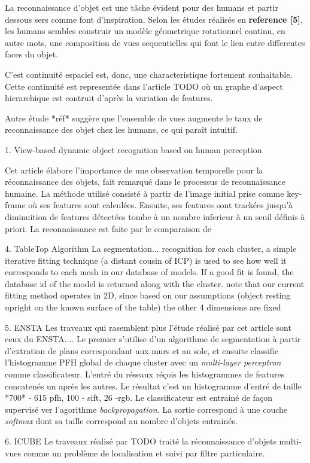 {La reconnaissance d'objet est une tâche évident pour des humans et partir dessous sers comme font d'inspiration.
Selon les études réalisés en \textbf{reference [5]}, les humans sembles construir un modèle géometrique rotationnel continu, en autre mots, une composition de vues sequentielles qui font le lien entre differentes faces du objet. 

C'est continuité espaciel est, donc, une characteristique fortement souhaitable. Cette continuité est representée dans l'article {\color{red} TODO} où un graphe d'aspect hierarchique est contruit d'après la variation de features. 

Autre étude *réf* suggère que l'ensemble de vues augmente le taux de reconnaissance des objet chez les humans, ce qui paraît intuitif.


1. View-based dynamic object recognition based on human perception 

Cet article élabore l'importance de une observation temporelle pour la réconnaissance des objets, fait remarqué dans le processus de reconnaissance humaine.
La méthode utilisé consisté à partir de l'image initial prise comme key-frame où ses features sont calculées. Ensuite, ses features sont trackées jusqu'à diminuition de features détectées tombe à un nombre inferieur à un seuil définis à priori. La reconnaissance est faite par le comparaison de 

4. TableTop Algorithm
La segmentation...
recognition
for each cluster, a simple iterative fitting technique (a distant cousin of ICP) is used to see how well it corresponds to each mesh in our database of models. If a good fit is found, the database id of the model is returned along with the cluster.
note that our current fitting method operates in 2D, since based on our assumptions (object resting upright on the known surface of the table) the other 4 dimensions are fixed

5. ENSTA 
Les traveaux qui rasemblent plus l'étude réalisé par cet article sont ceux du {\color{blue} ENSTA...}. Le premier s'utilise d'un algorithme de segmentation à partir d'extration de plans correspondant aux murs et au sole, et ensuite classifie l'histogramme PFH global de chaque cluster avec  un \textit{multi-layer perceptron} comme classificateur. L'entré du réseaux réçois les histogrammes de features concatenés un après les autres. Le résultat c'est un histogramme d'entré de taille *700* - 615 pfh, 100 - sift, 26 -rgb. Le classificateur est entrainé de façon supervisé ver l'agorithme \textit{backpropagation}. La sortie correspond à une couche \textit{softmax} dont sa taille correspond au nombre d'objets entrainés.

6. ICUBE
Le traveaux réalisé par {\color{blue} TODO } traité la réconnaissance d'objets multi-vues comme un problème de localisation et suivi par filtre particulaire. 

}

